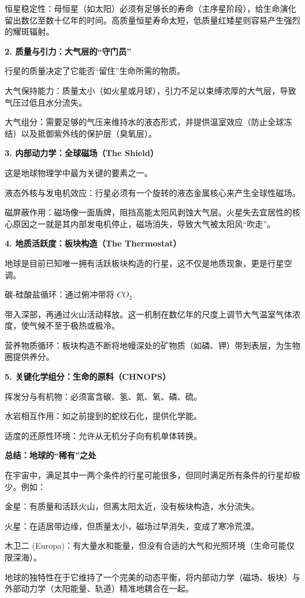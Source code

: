 \documentclass[12pt,a4paper]{article}
\begin{document}
	恒星稳定性：母恒星（如太阳）必须有足够长的寿命（主序星阶段），给生命演化留出数亿至数十亿年的时间。高质量恒星寿命太短，低质量红矮星则容易产生强烈的耀斑辐射。
	
	\textbf{2. 质量与引力：大气层的“守门员”}
	
	行星的质量决定了它能否“留住”生命所需的物质。
	
	大气保持能力：质量太小（如火星或月球），引力不足以束缚浓厚的大气层，导致气压过低且水分流失。
	
	大气组分：需要足够的气压来维持水的液态形式，并提供温室效应（防止全球冻结）以及抵御紫外线的保护层（臭氧层）。
	
	\textbf{3. 内部动力学：全球磁场（The Shield）}
	
	这是地球物理学中最为关键的要素之一。
	
	液态外核与发电机效应：行星必须有一个旋转的液态金属核心来产生全球性磁场。
	
	磁屏蔽作用：磁场像一面盾牌，阻挡高能太阳风剥蚀大气层。火星失去宜居性的核心原因之一就是其内部发电机停止，磁场消失，导致大气被太阳风“吹走”。
	
	\textbf{4. 地质活跃度：板块构造（The Thermostat）}
	
	地球是目前已知唯一拥有活跃板块构造的行星，这不仅是地质现象，更是行星空调。
	
	碳-硅酸盐循环：通过俯冲带将 $CO_2$
	
	带入深部，再通过火山活动释放。这一机制在数亿年的尺度上调节大气温室气体浓度，使气候不至于极热或极冷。
	
	营养物质循环：板块构造不断将地幔深处的矿物质（如磷、钾）带到表层，为生物圈提供养分。
	
	\textbf{5. 关键化学组分：生命的原料（CHNOPS）}
	
	挥发分与有机物：必须富含碳、氢、氮、氧、磷、硫。
	
	水岩相互作用：如之前提到的蛇纹石化，提供化学能。
	
	适度的还原性环境：允许从无机分子向有机单体转换。
	
	\textbf{总结：地球的“稀有”之处}
	
	在宇宙中，满足其中一两个条件的行星可能很多，但同时满足所有条件的行星却极少。例如：
	
	金星：有质量和活跃火山，但离太阳太近，没有板块构造，水分流失。
	
	火星：在适居带边缘，但质量太小，磁场过早消失，变成了寒冷荒漠。
	
	木卫二 (Europa)：有大量水和能量，但没有合适的大气和光照环境（生命可能仅限深海）。
	
	地球的独特性在于它维持了一个完美的动态平衡，将内部动力学（磁场、板块）与外部动力学（太阳能量、轨道）精准地耦合在一起。
	
\end{document}
